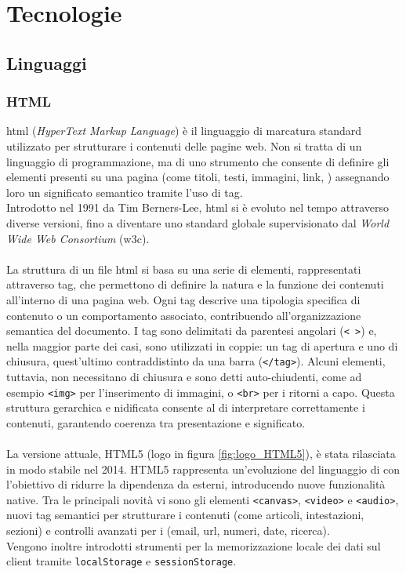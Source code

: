 \chapter{Tecnologie}
\label{chap:linguaggi-tecnologie}

\section{Linguaggi}
\subsection{HTML}
\label{subsec:html}
\noindent \acrshort{html} (\textit{HyperText Markup Language}) è il linguaggio di marcatura standard utilizzato per strutturare i contenuti delle pagine web. Non si tratta di un linguaggio di programmazione, ma di uno strumento che consente di definire gli elementi presenti su una pagina (come titoli, testi, immagini, link, ) assegnando loro un significato semantico tramite l’uso di tag. \\
Introdotto nel 1991 da Tim Berners-Lee, \acrshort{html} si è evoluto nel tempo attraverso diverse versioni, fino a diventare uno standard globale supervisionato dal \textit{World Wide Web Consortium} (\acrshort{w3c}).\\
\\
La struttura di un file \acrshort{html} si basa su una serie di elementi, rappresentati attraverso tag, che permettono di definire la natura e la funzione dei contenuti all'interno di una pagina web. Ogni tag descrive una tipologia specifica di contenuto o un comportamento associato, contribuendo all'organizzazione semantica del documento. I tag sono delimitati da parentesi angolari (\texttt{< >}) e, nella maggior parte dei casi, sono utilizzati in coppie: un tag di apertura e uno di chiusura, quest’ultimo contraddistinto da una barra (\texttt{</tag>}). Alcuni elementi, tuttavia, non necessitano di chiusura e sono detti auto-chiudenti, come ad esempio \texttt{<img>} per l’inserimento di immagini, o \texttt{<br>} per i ritorni a capo. Questa struttura gerarchica e nidificata consente al  di interpretare correttamente i contenuti, garantendo coerenza tra presentazione e significato.\\
\\
La versione attuale, HTML5 (logo in figura \ref{fig:logo_HTML5}), è stata rilasciata in modo stabile nel 2014.
HTML5 rappresenta un’evoluzione del linguaggio di  con l’obiettivo di ridurre la dipendenza da  esterni, introducendo nuove funzionalità native. Tra le principali novità vi sono gli elementi \texttt{<canvas>}, \texttt{<video>} e \texttt{<audio>}, nuovi tag semantici per strutturare i contenuti (come articoli, intestazioni, sezioni) e controlli avanzati per i  (email, \acrshort{url}, numeri, date, ricerca). 
\\Vengono inoltre introdotti strumenti per la memorizzazione locale dei dati sul client tramite \texttt{localStorage} e \texttt{sessionStorage}.

